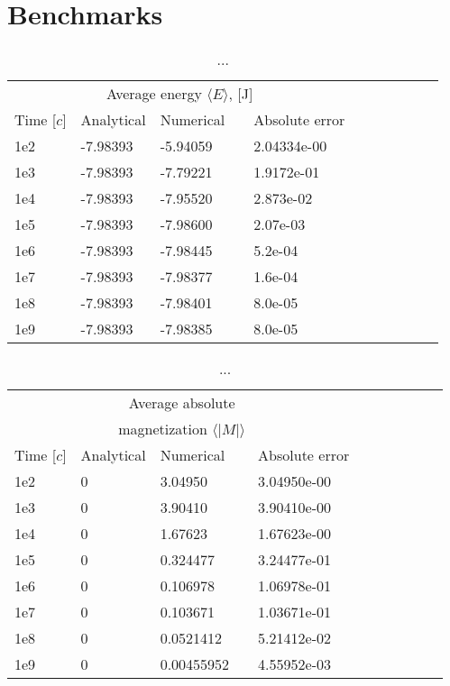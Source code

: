 \documentclass[norsk,a4paper,12pt]{article}
\begin{document}
\section{Benchmarks}
\begin{table}[H]
\centering
\caption{...}
\label{tab:benchmark1} 
\begin{tabularx}{\textwidth}{XlXrXrXrXrX}
\toprule
\multicolumn{5}{c}{Average energy $\langle E\rangle$, [J]}\\
\cline{2-3}
Time [$c$]  & Analytical  & Numerical && Absolute error\\
\midrule
1e2   & -7.98393  & -5.94059   && 2.04334e-00\\
1e3   & -7.98393  & -7.79221   && 1.9172e-01\\
1e4   & -7.98393  & -7.95520   && 2.873e-02\\
1e5   & -7.98393  & -7.98600   && 2.07e-03\\
1e6   & -7.98393  & -7.98445   && 5.2e-04\\
1e7 	  & -7.98393  & -7.98377   && 1.6e-04\\
1e8   & -7.98393  & -7.98401   && 8.0e-05\\
1e9   & -7.98393  & -7.98385   && 8.0e-05\\
\bottomrule
\end{tabularx}
\end{table}
\begin{table}[H]
\centering
\caption{...}
\label{tab:benchmark2} 
\begin{tabularx}{\textwidth}{XlXrXrXrXrX}
\toprule
\multicolumn{5}{c}{Average absolute}\\
\multicolumn{5}{c}{magnetization $\langle |M|\rangle$}\\
\cline{2-3}
Time [$c$]  & Analytical  & Numerical && Absolute error\\
\midrule
1e2   & 0  & 3.04950   && 3.04950e-00\\
1e3   & 0  & 3.90410   && 3.90410e-00\\
1e4   & 0  & 1.67623   && 1.67623e-00\\
1e5   & 0  & 0.324477  && 3.24477e-01\\
1e6   & 0  & 0.106978  && 1.06978e-01\\
1e7 	  & 0  & 0.103671  && 1.03671e-01\\
1e8   & 0  & 0.0521412 && 5.21412e-02\\
1e9   & 0  & 0.00455952&& 4.55952e-03\\
\bottomrule
\end{tabularx}
\end{table}
\end{document}
